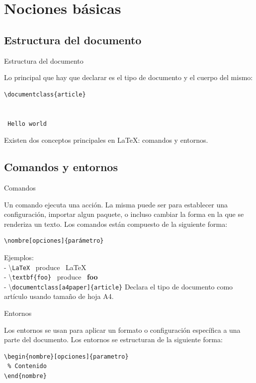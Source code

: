 \section{Nociones básicas}
\frame{\tableofcontents[currentsection]}

\subsection{Estructura del documento}
\begin{frame}[fragile]{Estructura del documento}

Lo principal que hay que declarar es el tipo de documento y el cuerpo del
mismo:

\begin{lstlisting}
\documentclass{article}


 Hello world

\end{lstlisting}

\pause
\vspace{5mm}
Existen dos conceptos principales en \LaTeX: comandos y entornos.

\end{frame}

\subsection{Comandos y entornos}
\begin{frame}[fragile]{Comandos}

Un comando ejecuta una acción. La misma puede ser para establecer una
configuración, importar algun paquete, o incluso cambiar la forma en la que se
renderiza un texto. Los comandos están compuesto de la siguiente forma:

\begin{verbatim}
\nombre[opciones]{parámetro}
\end{verbatim}

\pause

Ejemplos:\\[2mm]
- \textbackslash\texttt{LaTeX} ~produce~ \LaTeX\\
- \textbackslash\texttt{textbf\{foo\}} ~produce~ \textbf{foo}\\
- \textbackslash\texttt{documentclass[a4paper]\{article\}} Declara el tipo de documento como artículo usando tamaño de hoja A4.

\end{frame}

\begin{frame}[fragile]{Entornos}

Los entornos se usan para aplicar un formato o configuración específica a una
parte del documento. Los entornos se estructuran de la siguiente forma:

\begin{lstlisting}
\begin{nombre}[opciones]{parametro}
 % Contenido
\end{nombre}
\end{lstlisting}

\end{frame}

